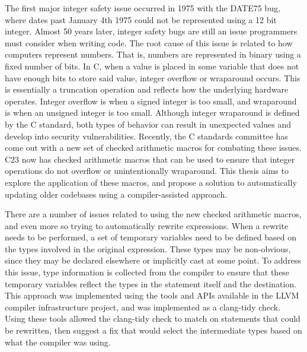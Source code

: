 \abstract

The first major integer safety issue occurred in 1975 with the DATE75 bug, where dates past January 4th 1975 could not be represented using a 12 bit integer. Almost 50 years later, integer safety bugs are still an issue programmers must consider when writing code. The root cause of this issue is related to how computers represent numbers. That is, numbers are represented in binary using a fixed number of bits. In C, when a value is placed in some variable that does not have enough bits to store said value, integer overflow or wraparound occurs. This is essentially a truncation operation and reflects how the underlying hardware operates. Integer overflow is when a signed integer is too small, and wraparound is when an unsigned integer is too small. Although integer wraparound is defined by the C standard, both types of behavior can result in unexpected values and develop into security vulnerabilities. Recently, the C standards committee has come out with a new set of checked arithmetic macros for combating these issues. C23 now has checked arithmetic macros that can be used to ensure that integer operations do not overflow or unintentionally wraparound. This thesis aims to explore the application of these macros, and propose a solution to automatically updating older codebases using a compiler-assisted approach.

There are a number of issues related to using the new checked arithmetic macros, and even more so trying to automatically rewrite expressions. When a rewrite needs to be performed, a set of temporary variables need to be defined based on the types involved in the original expression. These types may be non-obvious, since they may be declared elsewhere or implicitly cast at some point. To address this issue, type information is collected from the compiler to ensure that these temporary variables reflect the types in the statement itself and the destination. This approach was implemented using the tools and APIs available in the LLVM compiler infrastructure project, and was implemented as a clang-tidy check. Using these tools allowed the clang-tidy check to match on statements that could be rewritten, then suggest a fix that would select the intermediate types based on what the compiler was using.

